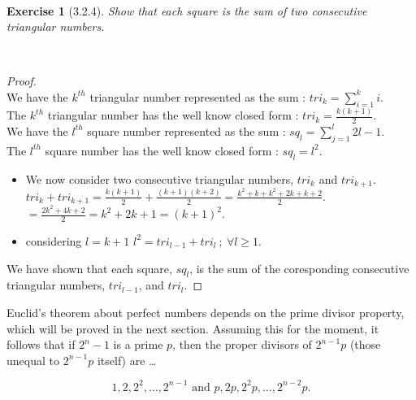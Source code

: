 \documentclass[12pt]{article}
\newcommand{\XB}{\color{black}}
\newcommand{\XBB}{\color{blue}}
\newcommand{\ds}{\displaystyle}
\theoremstyle{plain}
\newtheorem{ex}{Exercise}
\begin{document}
\newpage
\XBB\hrulefill\XB \\
\begin{ex} [3.2.4]
  Show that each square is the sum of two consecutive triangular numbers.
\end{ex}
\XBB\hrulefill\XB \\

\begin{proof}
  \ \\

  We have the $k^{th}$ triangular number represented as the sum : $ \ds tri_{k} = \sum_{i = 1}^{k} i $. \\

  The $k^{th}$ triangular number has the well know closed form : $ \ds tri_{k} = \frac{k(k + 1)}{2} $. \\

  We have the $l^{th}$ square number represented as the sum : $ \ds sq_{l} = \sum_{j = 1}^{l} 2l -1 $. \\

  The $l^{th}$ square number has the well know closed form : $ \ds sq_{l} = l^{2} $. \\

  \begin{itemize}
    \item We now consider two consecutive triangular numbers, $ tri_{k} $ and $ tri_{k + 1} $.
    \subitem $ \ds tri_{k} + tri_{k + 1} = \frac{k(k + 1)}{2} + \frac{(k + 1)(k + 2)}{2} = \frac{k^{2} + k + k^{2} + 2k + k + 2}{2} $.
    \subitem $ \ds = \frac{2k^{2} + 4k + 2}{2} = k^{2} + 2k + 1 = (k + 1)^{2} $.
    \item considering $ l = k + 1 $
    \subitem $ l^{2} = tri_{l-1} + tri_{l} \ ; \ \forall l \ge 1 $.
  \end{itemize}

  We have shown that each square, $ sq_{l} $, is the sum of the coresponding consecutive triangular numbers, $ tri_{l-1} $, and $ tri_{l} $.

\end{proof}

\newpage

\begin{center}
  Euclid's theorem about perfect numbers depends on the prime divisor property, which will be proved in the next section. Assuming this for the moment, it follows that if $ 2^{n} - 1 $ is a prime $ p $, then the proper divisors of $ 2^{n - 1}p $ (those unequal to $ 2^{n - 1}p $ itself) are \dots
\end{center}
\[
  1,2,2^2,\ldots,2^{n - 1}\text{ and }p,2p,2^{2}p,\ldots,2^{n - 2}p.
\]
\end{document}
